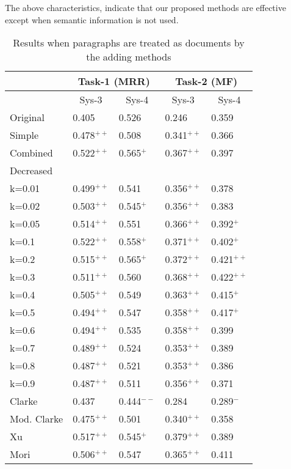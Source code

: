 The above characteristics, 
indicate that
our proposed methods are effective except when 
semantic information is not used. 

\begin{table}[t]
  \begin{center}
    \caption{Results when paragraphs are treated as documents by the adding methods}
    \begin{tabular}{|l|l|l|l|l|} \hline
         &  \multicolumn{2}{c|}{Task-1 (MRR)}        & \multicolumn{2}{c|}{Task-2 (MF)}\\\hline
         &  \multicolumn{1}{c|}{Sys-3}        & \multicolumn{1}{c|}{Sys-4}        &  \multicolumn{1}{c|}{Sys-3}        & \multicolumn{1}{c|}{Sys-4}        \\\hline
Original &  0.405        & 0.526        & 0.246        & 0.359\\\hline
Simple   &  0.478$^{++}$ & 0.508        & 0.341$^{++}$ & 0.366\\\hline
Combined &  0.522$^{++}$ & 0.565$^{+}$  & 0.367$^{++}$ & 0.397\\\hline
Decreased&               &              &              &                           \\
k=0.01   &  0.499$^{++}$ & 0.541        & 0.356$^{++}$ & 0.378\\
k=0.02   &  0.503$^{++}$ & 0.545$^{+}$  & 0.356$^{++}$ & 0.383\\
k=0.05   &  0.514$^{++}$ & 0.551        & 0.366$^{++}$ & 0.392$^{+}$\\
k=0.1    &  0.522$^{++}$ & 0.558$^{+}$  & 0.371$^{++}$ & 0.402$^{+}$\\
k=0.2    &  0.515$^{++}$ & 0.565$^{+}$  & 0.372$^{++}$ & 0.421$^{++}$\\
k=0.3    &  0.511$^{++}$ & 0.560        & 0.368$^{++}$ & 0.422$^{++}$\\
k=0.4    &  0.505$^{++}$ & 0.549        & 0.363$^{++}$ & 0.415$^{+}$\\
k=0.5    &  0.494$^{++}$ & 0.547        & 0.358$^{++}$ & 0.417$^{+}$\\
k=0.6    &  0.494$^{++}$ & 0.535        & 0.358$^{++}$ & 0.399\\
k=0.7    &  0.489$^{++}$ & 0.524        & 0.353$^{++}$ & 0.389\\
k=0.8    &  0.487$^{++}$ & 0.521        & 0.353$^{++}$ & 0.386\\
k=0.9    &  0.487$^{++}$ & 0.511        & 0.356$^{++}$ & 0.371\\\hline
Clarke   &  0.437        & 0.444$^{--}$ & 0.284        & 0.289$^{-}$\\\hline
Mod. Clarke&0.475$^{++}$ & 0.501        & 0.340$^{++}$ & 0.358\\\hline
Xu       &  0.517$^{++}$ & 0.545$^{+}$  & 0.379$^{++}$ & 0.389\\\hline
Mori     &  0.506$^{++}$ & 0.547        & 0.365$^{++}$ & 0.411\\\hline
\end{tabular}
\label{tab:dividing_method_results}
\end{center}
\end{table}

